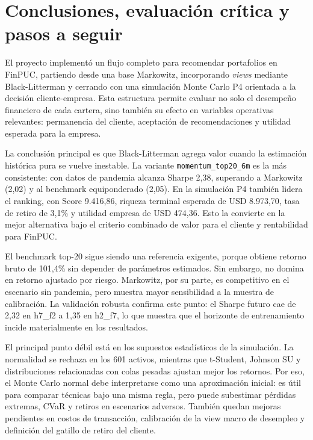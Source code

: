 \section{Conclusiones, evaluaci\'on cr\'itica y pasos a seguir}
El proyecto implement\'o un flujo completo para recomendar portafolios en FinPUC, partiendo desde una base Markowitz, incorporando \textit{views} mediante Black-Litterman y cerrando con una simulaci\'on Monte Carlo P4 orientada a la decisi\'on cliente-empresa. Esta estructura permite evaluar no solo el desempe\~no financiero de cada cartera, sino tambi\'en su efecto en variables operativas relevantes: permanencia del cliente, aceptaci\'on de recomendaciones y utilidad esperada para la empresa.

La conclusi\'on principal es que Black-Litterman agrega valor cuando la estimaci\'on hist\'orica pura se vuelve inestable. La variante \texttt{momentum\_top20\_6m} es la m\'as consistente: con datos de pandemia alcanza Sharpe 2,38, superando a Markowitz (2,02) y al benchmark equiponderado (2,05). En la simulaci\'on P4 tambi\'en lidera el ranking, con Score 9.416,86, riqueza terminal esperada de USD 8.973,70, tasa de retiro de 3,1\% y utilidad empresa de USD 474,36. Esto la convierte en la mejor alternativa bajo el criterio combinado de valor para el cliente y rentabilidad para FinPUC.

El benchmark top-20 sigue siendo una referencia exigente, porque obtiene retorno bruto de 101,4\% sin depender de par\'ametros estimados. Sin embargo, no domina en retorno ajustado por riesgo. Markowitz, por su parte, es competitivo en el escenario sin pandemia, pero muestra mayor sensibilidad a la muestra de calibraci\'on. La validaci\'on robusta confirma este punto: el Sharpe futuro cae de 2,32 en h7\_f2 a 1,35 en h2\_f7, lo que muestra que el horizonte de entrenamiento incide materialmente en los resultados.

El principal punto d\'ebil est\'a en los supuestos estad\'isticos de la simulaci\'on. La normalidad se rechaza en los 601 activos, mientras que t-Student, Johnson SU y distribuciones relacionadas con colas pesadas ajustan mejor los retornos. Por eso, el Monte Carlo normal debe interpretarse como una aproximaci\'on inicial: es \'util para comparar t\'ecnicas bajo una misma regla, pero puede subestimar p\'erdidas extremas, CVaR y retiros en escenarios adversos. Tambi\'en quedan mejoras pendientes en costos de transacci\'on, calibraci\'on de la view macro de desempleo y definici\'on del gatillo de retiro del cliente.

